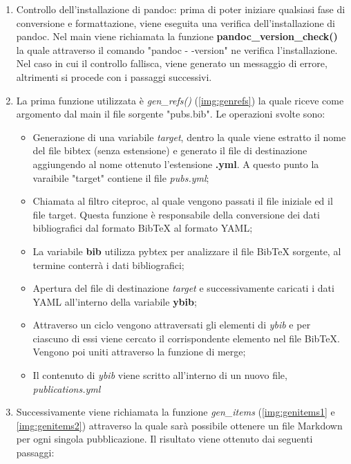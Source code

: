 \documentclass[target=bach,aauheader=]{thud}
\begin{document}
\begin{enumerate}
    \item Controllo dell'installazione di pandoc: prima di poter iniziare qualsiasi fase di conversione e formattazione, viene eseguita una verifica dell'installazione di pandoc. 
    \newline
    Nel main viene richiamata la funzione \textbf{pandoc\_version\_check()} la quale attraverso il comando "pandoc - -version" ne verifica l'installazione. 
    Nel caso in cui il controllo fallisca, viene generato un messaggio di errore, altrimenti si procede con i passaggi successivi.
    \item La prima funzione utilizzata è \textit{gen\_refs()} (\cref{img:genrefs}) la quale riceve come argomento dal main il file sorgente "pubs.bib". Le operazioni svolte sono:
    \begin{itemize}
        \item Generazione di una variabile \textit{target}, dentro la quale viene estratto il nome del file bibtex (senza estensione) e generato il file di destinazione aggiungendo al nome ottenuto l'estensione \textbf{.yml}. A questo punto la varaibile "target" contiene il file \textit{pubs.yml};
        \item Chiamata al filtro citeproc, al quale vengono passati il file iniziale ed il file target. Questa funzione è responsabile della conversione dei dati bibliografici dal formato BibTeX al formato YAML;
        \item La variabile \textbf{bib} utilizza pybtex per analizzare il file BibTeX sorgente, al termine conterrà i dati bibliografici;
        \item Apertura del file di destinazione \textit{target} e successivamente caricati i dati YAML all'interno della variabile \textbf{ybib};
        \item Attraverso un ciclo vengono attraversati gli elementi di \textit{ybib} e per ciascuno di essi viene cercato il corrispondente elemento nel file BibTeX. Vengono poi uniti attraverso la funzione di merge; 
        \item Il contenuto di \textit{ybib} viene scritto all'interno di un nuovo file, \textit{publications.yml} 
    \end{itemize}
    \item Successivamente viene richiamata la funzione \textit{gen\_items} (\cref{img:genitems1} e \cref{img:genitems2}) attraverso la quale sarà possibile ottenere un file Markdown per ogni singola pubblicazione. Il risultato viene ottenuto dai seguenti passaggi:

\end{enumerate}
\end{document}
